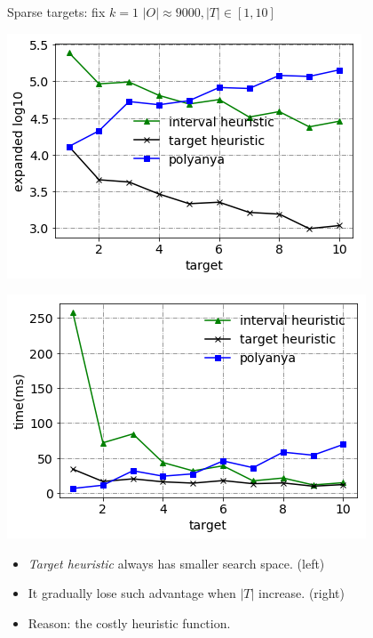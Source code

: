 \begin{frame}{Sparse targets: fix $k=1$}
\centering
$\scriptscriptstyle |O| \approx 9000, |T| \in [1, 10]$
\begin{minipage}{.5\textwidth}
    \begin{adjustbox}{max totalsize={.9\textwidth}{.9\textheight}, right}
    \centering
    \includegraphics{pic/e3_gen.png}
    \end{adjustbox}
\end{minipage}%
\begin{minipage}{.5\textwidth}
    \begin{adjustbox}{max totalsize={.9\textwidth}{.9\textheight}, right}
    \centering
    \includegraphics{pic/e3_time.png}
    \end{adjustbox}
\end{minipage}
\begin{itemize}
    \item \small{\textit{Target heuristic} always has smaller search space. (left)}
    \item \small{It gradually lose such advantage when $|T|$ increase. (right)}
    \item \small{Reason: the costly heuristic function.}
\end{itemize}
\end{frame}

